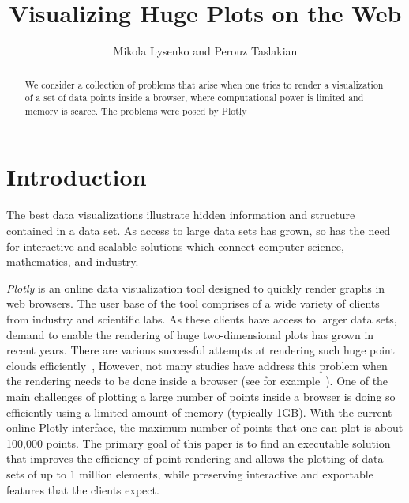 \documentclass[11pt,a4paper]{article}
\begin{document}
\title{Visualizing Huge Plots on the Web} 
\author{Mikola Lysenko and Perouz Taslakian}



\date{}

\maketitle



\begin{abstract}
We consider a collection of problems that arise when one 
tries to render a visualization of a set of data points inside a browser, 
where computational power is limited and memory is scarce. The problems were posed by Plotly
\end{abstract}

\section{Introduction}
The best data visualizations illustrate hidden information and structure 
contained in a data set. As access to large data sets has grown, so has the need for 
interactive and scalable solutions which connect computer science, mathematics, and industry. 

\emph{Plotly} is an online data visualization tool designed to quickly render graphs in web browsers. 
The user base of the tool comprises of a wide variety of clients from industry and scientific labs. 
As these clients have access to larger data sets, demand to enable the rendering of huge two-dimensional plots has grown in recent years. 
There are various successful attempts at rendering such huge point clouds efficiently~\cite{?????????},
However, not many studies have address this problem when the rendering needs to be done inside a browser (see for example~\cite{schutzrendering}).
One of the main challenges of plotting a large number of points
inside a browser is doing so efficiently using a limited amount of memory (typically 1GB). 
With the current online Plotly interface, the maximum number of points that one can plot is about 100,000 points. 
The primary goal of this paper is to find an executable solution that 
improves the efficiency of point rendering and allows the plotting of data sets of up to 1 million elements, 
while preserving interactive and exportable features that the clients expect.
\end{document}
